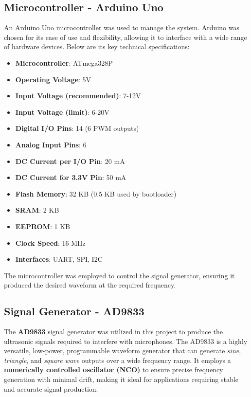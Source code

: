 \subsection{Microcontroller - Arduino Uno}
An Arduino Uno microcontroller was used to manage the system. Arduino was chosen for its ease of use and flexibility, allowing it to interface with a wide range of hardware devices. 
Below are its key technical specifications:
\begin{itemize}
    \item \textbf{Microcontroller}: ATmega328P
    \item \textbf{Operating Voltage}: 5V
    \item \textbf{Input Voltage (recommended)}: 7-12V
    \item \textbf{Input Voltage (limit)}: 6-20V
    \item \textbf{Digital I/O Pins}: 14 (6 PWM outputs)
    \item \textbf{Analog Input Pins}: 6
    \item \textbf{DC Current per I/O Pin}: 20 mA
    \item \textbf{DC Current for 3.3V Pin}: 50 mA
    \item \textbf{Flash Memory}: 32 KB (0.5 KB used by bootloader)
    \item \textbf{SRAM}: 2 KB
    \item \textbf{EEPROM}: 1 KB
    \item \textbf{Clock Speed}: 16 MHz
    \item \textbf{Interfaces}: UART, SPI, I2C
\end{itemize}
The microcontroller was employed to control the signal generator, ensuring it produced the desired waveform at the required frequency. 

\subsection{Signal Generator - AD9833}

The \textbf{AD9833} signal generator was utilized in this project to produce the ultrasonic signals required to interfere with microphones. The AD9833 is a highly versatile, low-power, programmable waveform generator that can generate \textit{sine}, \textit{triangle}, and \textit{square wave} outputs over a wide frequency range. It employs a \textbf{numerically controlled oscillator (NCO)} to ensure precise frequency generation with minimal drift, making it ideal for applications requiring stable and accurate signal production.

